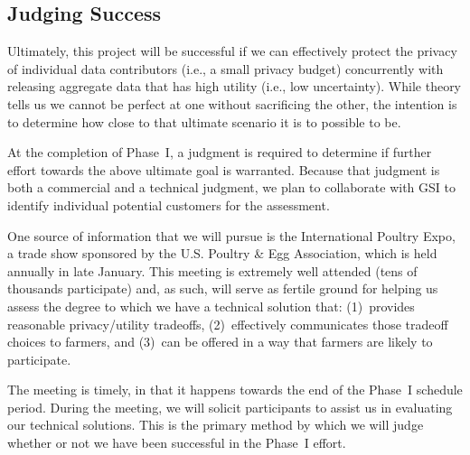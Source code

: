 \subsection{Judging Success}
\label{sec:exp}

Ultimately, this project will be successful if we can effectively
protect the privacy of individual data contributors (i.e., a small
privacy budget) concurrently with releasing aggregate data that has
high utility (i.e., low uncertainty).  While theory tells us we cannot
be perfect at one without sacrificing the other, the intention
is to determine how close to that ultimate scenario it is to possible to be.

At the completion of Phase~I, a judgment is required to determine if
further effort towards the above ultimate goal is warranted.
Because that judgment is both a commercial and a technical judgment, we
plan to collaborate with GSI to identify individual potential
customers for the assessment.

One source of information that we will pursue is the International
Poultry Expo, a trade show sponsored by the U.S. Poultry \& Egg Association,
which is held annually in late January.
This meeting is extremely well attended (tens of thousands participate)
and, as such, will serve as fertile ground for helping us assess the
degree to which we have a technical solution that: (1)~provides reasonable
privacy/utility tradeoffs, (2)~effectively communicates those tradeoff
choices to farmers, and (3)~can be offered in a way that farmers are
likely to participate.

The meeting is timely, in that it happens towards the end of the
Phase~I schedule period. During the meeting, we will solicit
participants to assist us in evaluating our technical solutions.
This is the primary method by which
we will judge whether or not we have been successful
in the Phase~I effort.

